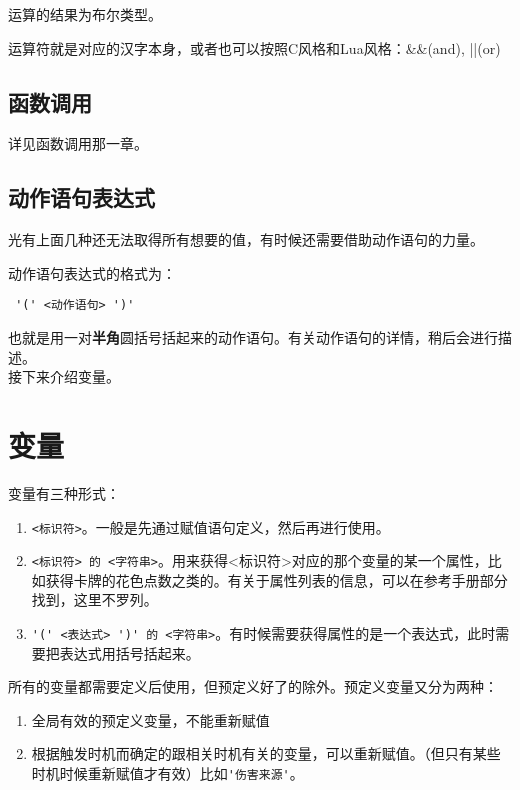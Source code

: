 运算的结果为布尔类型。

运算符就是对应的汉字本身，或者也可以按照C风格和Lua风格：\&\&(and), ||(or)

\subsection{函数调用}

详见函数调用那一章。

\subsection{动作语句表达式}

光有上面几种还无法取得所有想要的值，有时候还需要借助动作语句的力量。

动作语句表达式的格式为：

\begin{verbatim}
 '(' <动作语句> ')'
\end{verbatim}

也就是用一对\textbf{半角}圆括号括起来的动作语句。有关动作语句的详情，稍后会进行描述。\\

接下来介绍变量。

\section{变量}

变量有三种形式：

\begin{enumerate}
 \item \verb|<标识符>|。一般是先通过赋值语句定义，然后再进行使用。
 \item \verb|<标识符> 的 <字符串>|。用来获得<标识符>对应的那个变量的某一个属性，比如获得卡牌的花色点数之类的。有关于属性列表的信息，可以在参考手册部分找到，这里不罗列。
 \item \verb|'(' <表达式> ')' 的 <字符串>|。有时候需要获得属性的是一个表达式，此时需要把表达式用括号括起来。
\end{enumerate}

所有的变量都需要定义后使用，但预定义好了的除外。预定义变量又分为两种：

\begin{enumerate}
 \item 全局有效的预定义变量，不能重新赋值
 \item 根据触发时机而确定的跟相关时机有关的变量，可以重新赋值。（但只有某些时机时候重新赋值才有效）比如\verb|'伤害来源'|。
\end{enumerate}

